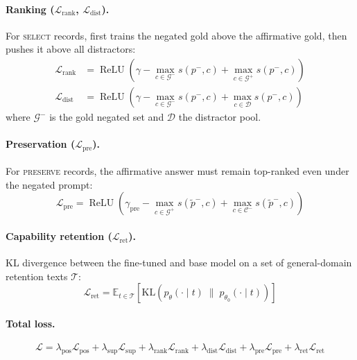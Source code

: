 \documentclass[letterpaper]{article}
\begin{document}
\paragraph{Ranking ($\mathcal{L}_\text{rank}$, $\mathcal{L}_\text{dist}$).}
For \textsc{select} records, first trains the negated gold above the
affirmative gold, then pushes it above all distractors:
\begin{align}
\mathcal{L}_\text{rank} &= \operatorname{ReLU}\!\left(
  \gamma - \max_{c \in \mathcal{G}^-} s(p^-, c)
  + \max_{c \in \mathcal{G}^+} s(p^-, c)
\right) \\
\mathcal{L}_\text{dist} &= \operatorname{ReLU}\!\left(
  \gamma - \max_{c \in \mathcal{G}^-} s(p^-, c)
  + \max_{c \in \mathcal{D}} s(p^-, c)
\right)
\end{align}
where $\mathcal{G}^-$ is the gold negated set and $\mathcal{D}$ the distractor pool.

\paragraph{Preservation ($\mathcal{L}_\text{pre}$).}
For \textsc{preserve} records, the affirmative answer must remain top-ranked
even under the negated prompt:
\begin{equation}
\mathcal{L}_\text{pre} = \operatorname{ReLU}\!\left(
  \gamma_\text{pre} - \max_{c \in \mathcal{G}^+} s(\tilde{p}^-, c)
  + \max_{c \in \mathcal{C}^-} s(\tilde{p}^-, c)
\right)
\end{equation}

\paragraph{Capability retention ($\mathcal{L}_\text{ret}$).}
KL divergence between the fine-tuned and base model on a set of
general-domain retention texts $\mathcal{T}$:
\begin{equation}
\mathcal{L}_\text{ret} = \mathbb{E}_{t \in \mathcal{T}}\!\left[
  \mathrm{KL}\!\left(p_\theta(\cdot \mid t) \;\|\; p_{\theta_0}(\cdot \mid t)\right)
\right]
\end{equation}

\paragraph{Total loss.}
\begin{equation}
\mathcal{L} = \lambda_\text{pos}\mathcal{L}_\text{pos}
+ \lambda_\text{sup}\mathcal{L}_\text{sup}
+ \lambda_\text{rank}\mathcal{L}_\text{rank}
+ \lambda_\text{dist}\mathcal{L}_\text{dist}
+ \lambda_\text{pre}\mathcal{L}_\text{pre}
+ \lambda_\text{ret}\mathcal{L}_\text{ret}
\end{equation}
\end{document}
